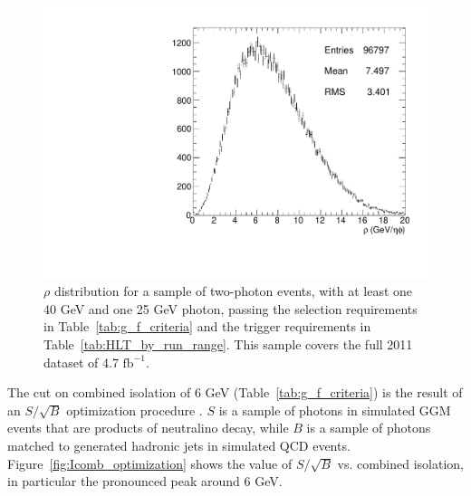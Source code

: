 \documentclass[dissertation.tex]{subfiles}
\begin{document}
\begin{figure}
	\centering
	\includegraphics[scale=0.5]{preselected_rho}
	\caption{$\rho$ distribution for a sample of two-photon events, with at least one 40 GeV and one 25 GeV photon, passing the selection requirements in Table~\ref{tab:g_f_criteria} and the trigger requirements in Table~\ref{tab:HLT_by_run_range}.  This sample covers the full 2011 dataset of 4.7 $\mbox{fb}^{-1}$.}
	\label{fig:preselected_rho}
\end{figure}

The cut on combined isolation of 6 GeV (Table~\ref{tab:g_f_criteria}) is the result of an $S/\sqrt{B}$ optimization procedure \cite{CMS_AN-2011-515}.  $S$ is a sample of photons in simulated GGM events that are products of neutralino decay, while $B$ is a sample of photons matched to generated hadronic jets in simulated QCD events.  Figure~\ref{fig:Icomb_optimization} shows the value of $S/\sqrt{B}$ vs. combined isolation, in particular the pronounced peak around 6 GeV.
\end{document}
